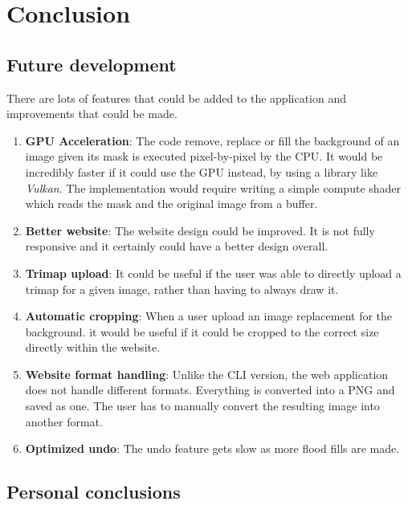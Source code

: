 \documentclass[a4paper]{article}
\begin{document}
\pagebreak

\section{Conclusion}

\subsection{Future development}

There are lots of features that could be added to the application
and improvements that could be made.

\begin{enumerate}
    \item \textbf{GPU Acceleration}: The code remove, replace or fill the background
    of an image given its mask is executed pixel-by-pixel by the CPU.
    It would be incredibly faster if it could use the GPU instead, by using
    a library like \textit{Vulkan}. The implementation would require
    writing a simple compute shader which reads the mask and the original image
    from a buffer.
    \item \textbf{Better website}: The website design could be improved. It is not
    fully responsive and it certainly could have a better design overall.
    \item \textbf{Trimap upload}: It could be useful if the user was able to
    directly upload a trimap for a given image, rather than having to always draw it.
    \item \textbf{Automatic cropping}: When a user upload an image replacement for the background.
    it would be useful if it could be cropped to the correct size directly within the website.
    \item \textbf{Website format handling}: Unlike the CLI version, the web application does
    not handle different formats. Everything is converted into a PNG and saved as one.
    The user has to manually convert the resulting image into another format.
    \item \textbf{Optimized undo}: The undo feature gets slow as more
    flood fills are made.
\end{enumerate}

\subsection{Personal conclusions}

\pagebreak

\listoffigures

\pagebreak

\nocite{*} %

\printbibliography

\pagebreak

\printnoidxglossary
\end{document}
